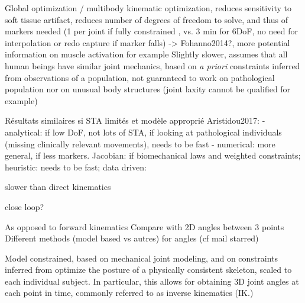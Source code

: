 Global optimization / multibody kinematic optimization, reduces sensitivity to soft tissue artifact, reduces number of degrees of freedom to solve, and thus of markers needed (1 per joint if fully constrained \cite{Slater2018}, vs. 3 min for 6DoF, no need for interpolation or redo capture if marker falls) -> Fohanno2014?, more potential information on muscle activation for example \cite{Robinson2013,Kainz2016}
Slightly slower, assumes that all human beings have similar joint mechanics, based on \textit{a priori} constraints inferred from observations of a population, not guaranteed to work on pathological population nor on unusual body structures (joint laxity cannot be qualified for example)

Résultats similaires si STA limités et modèle approprié \cite{Kainz2016}
Aristidou2017: 
- analytical: if low DoF, not lots of STA, if looking at pathological individuals (missing  clinically relevant movements), needs to be fast
- numerical: more general, if less markers. Jacobian: if biomechanical laws and weighted constraints; heuristic: needs to be fast; data driven:

slower than direct kinematics



close loop?


As opposed to forward kinematics \newline
Compare with 2D angles between 3 points \newline
Different methods (model based vs autres) for angles (cf mail starred)\newline


Model constrained, based on mechanical joint modeling, and on constraints inferred from  
optimize the posture of a physically consistent skeleton, scaled to each individual subject. In particular, this allows for obtaining 3D joint angles at each point in time, commonly referred to as inverse kinematics (IK.)







